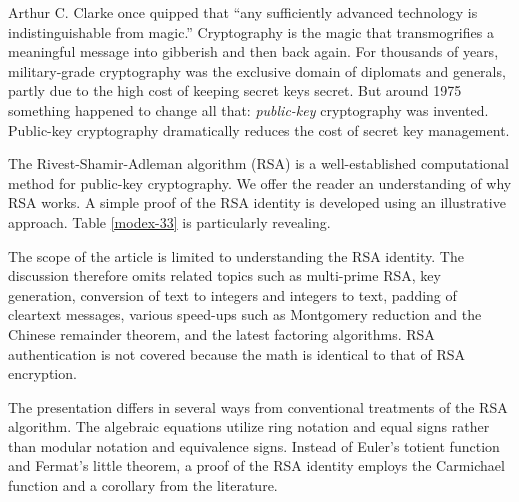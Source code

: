 
Arthur C. Clarke once quipped that
``any sufficiently advanced technology is indistinguishable from magic.''
Cryptography is the magic that
transmogrifies a meaningful message into gibberish and then back again.
For thousands of years, military-grade cryptography was the exclusive domain of 
diplomats and generals, partly due to the high cost of keeping secret keys secret.
But around 1975 something happened to change all that: \emph{public-key} cryptography was invented.
Public-key cryptography dramatically reduces the cost of secret key management.

The Rivest-Shamir-Adleman algorithm (RSA) is a well-established computational method 
for public-key cryptography.\cite{RSA-paper}
We offer the reader an understanding of why RSA works.
A simple proof of the RSA identity is developed using an illustrative approach.
Table \ref{modex-33} is particularly revealing.

The scope of the article is limited to understanding the RSA identity.
The discussion therefore omits related topics such as multi-prime RSA, key generation,
conversion of text to integers and integers to text, padding of cleartext messages,
various speed-ups such as Montgomery reduction and the Chinese remainder theorem,
and the latest factoring algorithms.
RSA authentication is not covered because the math is identical to that of RSA encryption.

The presentation differs in several ways from conventional treatments of the RSA algorithm.
The algebraic equations utilize ring notation and equal signs
rather than modular notation and equivalence signs.
Instead of Euler's totient function and Fermat's little theorem,
a proof of the RSA identity employs the Carmichael function
and a corollary from the literature.\cite{ray-attack}


